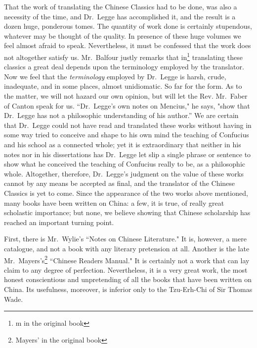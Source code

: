 That the work of translating the Chinese Classics had to be done, was also a necessity of the time, and Dr.~Legge has accomplished it, and the result is a dozen huge, ponderous tomes.
The quantity of work done is certainly stupendous, whatever may be thought of the quality.
In presence of these huge volumes we feel almost afraid to speak.
Nevertheless, it must be confessed that the work does not altogether satisfy us.
Mr.~Balfour  justly remarks that in\footnote{m in the original book} translating these classics a great deal depends upon the terminology employed by the translator.
Now we feel that the \emph{terminology} employed by Dr.~Legge is harsh, crude, inadequate, and in some places, almost unidiomatic.
So far for the form.
As to the matter, we will not hazard our own opinion, but will let the Rev.  Mr.~Faber of Canton speak for us.
``Dr.~Legge's own notes on Mencius," he says, "show that Dr.~Legge has not a philosophic understanding of his author.''
We are certain that Dr.~Legge could not have read and translated these works without having in some way tried to conceive and shape to his own mind the teaching of Confucius and his school as a connected whole; yet it is extraordinary that neither in his notes nor in his dissertations has Dr.~Legge let slip a single phrase or sentence to show what he conceived the teaching of Confucius really to be, as a philosophic whole.
Altogether, therefore, Dr.~Legge's judgment on the value of these works cannot by any means  be accepted as final, and the translator of the Chinese Classics is yet to come.
Since the appearance of the two works above mentioned, many books have been written on China: a few, it is true, of really great scholastic importance; but none, we believe showing that Chinese scholarship has reached an important turning point.

First, there is Mr.~Wylie's   ``Notes on Chinese Literature."
It is, however, a mere catalogue, and not a book with any literary pretension at all.
Another is the late Mr.~Mayers's\footnote{Mayers' in the original book}  ``Chinese Readers Manual."
It is certainly not a work that can lay claim to any degree of perfection.
Nevertheless, it is a very great work, the most honest conscientious and unpretending of all the books that have been written on China.
Its usefulness, moreover, is inferior only to the Tzu-Erh-Chi of Sir Thomas Wade.

